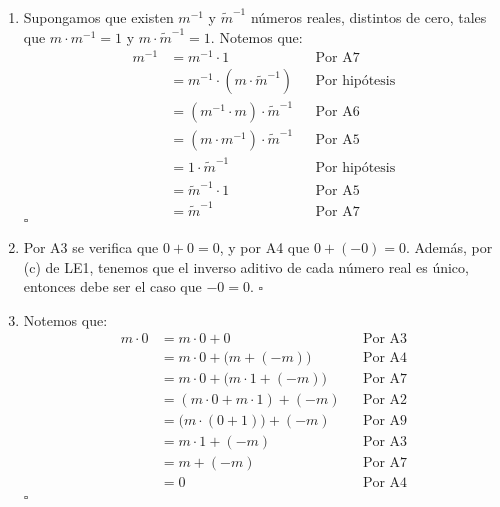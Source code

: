 \documentclass[11pt]{article}
\begin{document}
\begin{enumerate}[label=\alph*), font=\bfseries]
    \item Supongamos que existen $m^{-1}$ y $\tilde{m}^{-1}$ números reales, distintos de cero, tales que $m \cdot m^{-1} = 1$ y $m \cdot \tilde{m}^{-1} = 1$. Notemos que:
        \begin{align*}
        m^{-1} &= m^{-1} \cdot 1 && \text{Por A7} \\
        &= m^{-1} \cdot \left(m \cdot \tilde{m}^{-1} \right) && \text{Por hipótesis} \\
        &= \left( m^{-1} \cdot m \right) \cdot \tilde{m} ^{-1} && \text{Por A6} \\
        &= \left(m \cdot m^{-1} \right) \cdot \tilde{m}^{-1} && \text{Por A5} \\
        &= 1 \cdot \tilde{m}^{-1} && \text{Por hipótesis} \\
        &= \tilde{m}^{-1} \cdot 1 && \text{Por A5} \\
        &= \tilde{m}^{-1} && \text{Por A7}
        \end{align*} \mbox{}\hfill $\square$
    
    \item Por A3 se verifica que $0 + 0 = 0$, y por A4 que $0 + (-0) = 0$. Además, por (c) de LE1, tenemos que el inverso aditivo de cada número real es único, entonces debe ser el caso que $-0 = 0$. \mbox{}\hfill  $\square$
    
    \item Notemos que:
    \begin{align*}
        m\cdot0&=m\cdot0+0 && \text{Por A3}\\
        &=m\cdot0+\bigl(m+\left(-m\right)\bigr) && \text{Por A4}\\
        &=m\cdot0+\bigl(m\cdot1+\left(-m\right)\bigr) && \text{Por A7}\\
        &=\left(m\cdot0+m\cdot1\right)+\left(-m\right) && \text{Por A2}\\
        &=\bigl(m\cdot\left(0+1\right)\bigr)+\left(-m\right) && \text{Por A9}\\
        &=m\cdot1+\left(-m\right) && \text{Por A3}\\
        &=m+\left(-m\right) && \text{Por A7}\\
        &=0 && \text{Por A4}\\
    \end{align*} \mbox{}\hfill $\square$
    

\end{enumerate}
\end{document}
